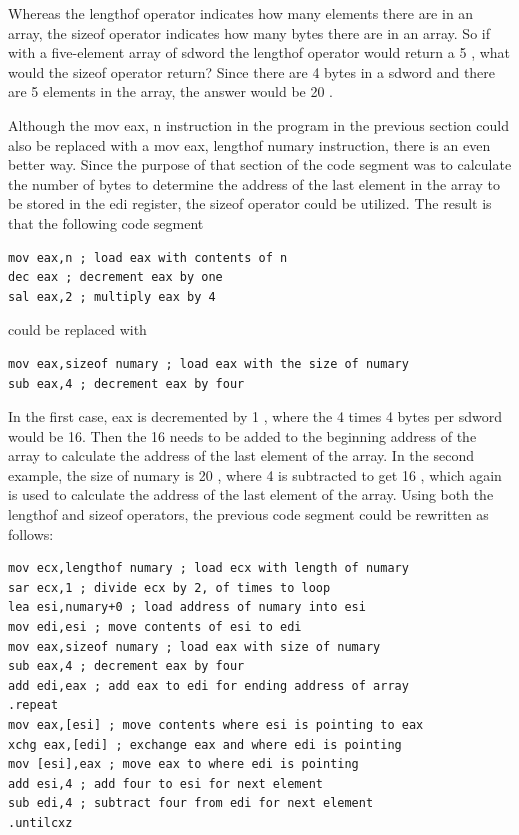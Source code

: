 \documentclass[10pt]{book}
\begin{document}
Whereas the lengthof operator indicates how many elements there are in an array, the sizeof operator indicates how many bytes there are in an array. So if with a five-element array of sdword the lengthof operator would return a 5 , what would the sizeof operator return? Since there are 4 bytes in a sdword and there are 5 elements in the array, the answer would be 20 .

Although the mov eax, n instruction in the program in the previous section could also be replaced with a mov eax, lengthof numary instruction, there is an even better way. Since the purpose of that section of the code segment was to calculate the number of bytes to determine the address of the last element in the array to be stored in the edi register, the sizeof operator could be utilized. The result is that the following code segment

\begin{verbatim}
mov eax,n ; load eax with contents of n
dec eax ; decrement eax by one
sal eax,2 ; multiply eax by 4
\end{verbatim}

could be replaced with

\begin{verbatim}
mov eax,sizeof numary ; load eax with the size of numary
sub eax,4 ; decrement eax by four
\end{verbatim}

In the first case, eax is decremented by 1 , where the 4 times 4 bytes per sdword would be 16. Then the 16 needs to be added to the beginning address of the array to calculate the address of the last element of the array. In the second example, the size of numary is 20 , where 4 is subtracted to get 16 , which again is used to calculate the address of the last element of the array. Using both the lengthof and sizeof operators, the previous code segment could be rewritten as follows:


\begin{verbatim}
mov ecx,lengthof numary ; load ecx with length of numary
sar ecx,1 ; divide ecx by 2, of times to loop
lea esi,numary+0 ; load address of numary into esi
mov edi,esi ; move contents of esi to edi
mov eax,sizeof numary ; load eax with size of numary
sub eax,4 ; decrement eax by four
add edi,eax ; add eax to edi for ending address of array
.repeat
mov eax,[esi] ; move contents where esi is pointing to eax
xchg eax,[edi] ; exchange eax and where edi is pointing
mov [esi],eax ; move eax to where edi is pointing
add esi,4 ; add four to esi for next element
sub edi,4 ; subtract four from edi for next element
.untilcxz
\end{verbatim}
\end{document}
